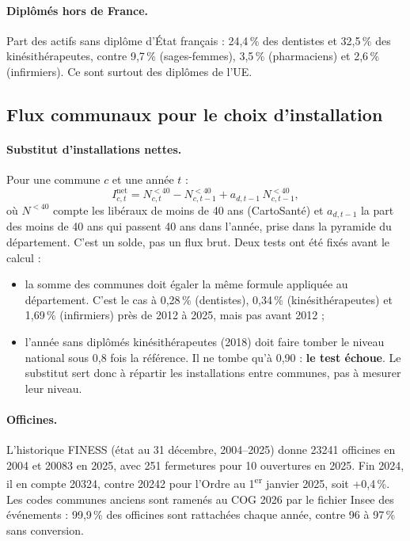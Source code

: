 \documentclass[11pt]{article}
\begin{document}
\paragraph{Diplômés hors de France.} Part des actifs sans diplôme d'État français\mesure{} : 24,4\,\% des
dentistes et 32,5\,\% des kinésithérapeutes, contre 9,7\,\% (sages-femmes), 3,5\,\% (pharmaciens) et
2,6\,\% (infirmiers). Ce sont surtout des diplômes de l'UE.

\subsection{Flux communaux pour le choix d'installation}\label{sec:res-flux}
\paragraph{Substitut d'installations nettes.} Pour une commune $c$ et une année $t$ :
\begin{equation}
I^{\mathrm{net}}_{c,t} = N^{<40}_{c,t} - N^{<40}_{c,t-1} + a_{d,t-1}\, N^{<40}_{c,t-1},
\end{equation}
où $N^{<40}$ compte les libéraux de moins de 40 ans (CartoSanté) et $a_{d,t-1}$ la part des moins de 40 ans qui
passent 40 ans dans l'année, prise dans la pyramide du département. C'est un solde, pas un flux brut. Deux tests
ont été fixés avant le calcul :
\begin{itemize}
  \item la somme des communes doit égaler la même formule appliquée au département. C'est le cas à
  0,28\,\% (dentistes), 0,34\,\% (kinésithérapeutes) et 1,69\,\% (infirmiers) près de 2012 à 2025\mesure{},
  mais pas avant 2012 ;
  \item l'année sans diplômés kinésithérapeutes (2018) doit faire tomber le niveau national sous 0,8 fois la
  référence. Il ne tombe qu'à 0,90\mesure{} : \textbf{le test échoue}. Le substitut sert donc à répartir les
  installations entre communes, pas à mesurer leur niveau.
\end{itemize}

\paragraph{Officines.} L'historique FINESS (état au 31 décembre, 2004--2025) donne \num{23241} officines en
2004 et \num{20083} en 2025\mesure{}, avec 251 fermetures pour 10 ouvertures en 2025. Fin 2024, il en compte
\num{20324}, contre \num{20242} pour l'Ordre au 1\textsuperscript{er} janvier 2025\citep{ordre2025demo}, soit
+0,4\,\%\mesure{}. Les codes communes anciens sont ramenés au COG 2026 par le fichier Insee des événements
\citep{insee2026cog} : 99,9\,\% des officines sont rattachées chaque année, contre 96 à 97\,\% sans
conversion\mesure{}.
\end{document}
